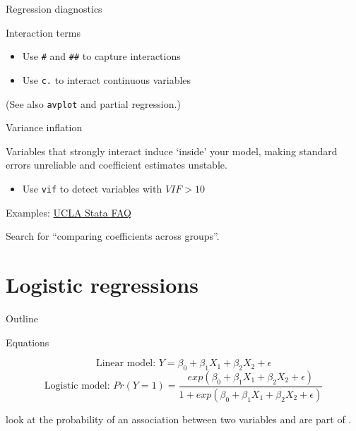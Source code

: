 \documentclass[t]{beamer}
\begin{document}
	\begin{frame}[t]{Regression diagnostics}

		\begin{block}{Interaction terms}

			\begin{itemize}
				\item Use \texttt{\#} and \texttt{\#\#} to capture interactions
				\item Use \texttt{c.} to interact continuous variables
			\end{itemize}
			
			(See also \texttt{avplot} and partial regression.)
		\end{block}

		\begin{alertblock}{Variance inflation}

			Variables that strongly interact induce  `inside' your model, making standard errors unreliable and coefficient estimates unstable.
			\begin{itemize}
				\item 	 Use \texttt{vif} to detect variables with $VIF > 10$
			\end{itemize}
			


		\end{alertblock}

		\begin{exampleblock}{Examples: \href{http://www.ats.ucla.edu/stat/stata/faq/}{UCLA Stata FAQ}}

			Search for ``comparing coefficients across groups''.

		\end{exampleblock}
					
	\end{frame}

\section{Logistic regressions}

	\begin{frame}[t]{Outline}
	
	\begin{block}{Equations}
	
	$$\text{Linear model:~} Y = \beta_0 + \beta_1 X_1 + \beta_2 X_2 + \epsilon$$
	$$\text{Logistic model:~} Pr(Y=1) = \frac{exp(\beta_0 + \beta_1 X_1 + \beta_2 X_2 + \epsilon)}{1+exp(\beta_0 + \beta_1 X_1 + \beta_2 X_2 + \epsilon)}$$
	\end{block}
		
	 look at the probability of an association between two variables and are part of .\\[.5em]
	

	\end{frame}
	
\end{document}
